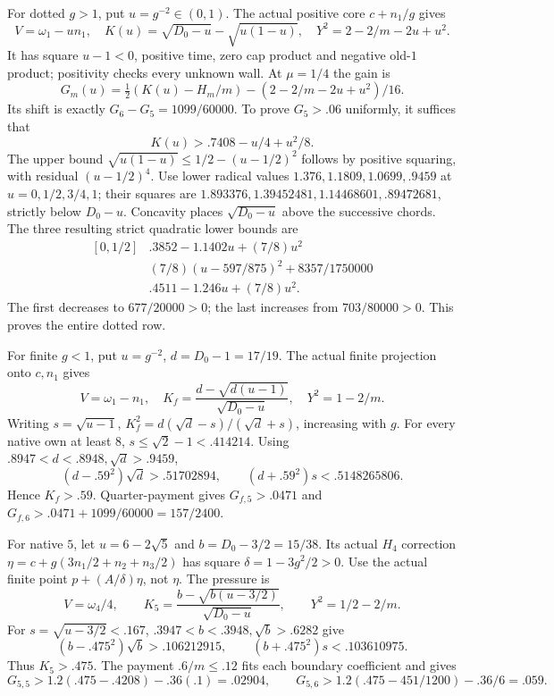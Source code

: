 For dotted \(g>1\), put \(u=g^{-2}\in(0,1)\).
The actual positive core \(c+n_1/g\) gives
\[
 V=\omega_1-un_1,\quad
 K(u)=\sqrt{D_0-u}-\sqrt{u(1-u)},\quad
 Y^2=2-2/m-2u+u^2.
\]
It has square \(u-1<0\), positive time,
zero cap product and negative old-\(1\)
product; positivity checks every unknown wall.
At \(\mu=1/4\) the gain is
\[
 G_m(u)=\tfrac12(K(u)-H_m/m)
        -(2-2/m-2u+u^2)/16.
\]
Its shift is exactly
\(G_6-G_5=1099/60000\).
To prove \(G_5>.06\) uniformly, it suffices that
\[
 K(u)>.7408-u/4+u^2/8.
\]
The upper bound
\(\sqrt{u(1-u)}\leq1/2-(u-1/2)^2\)
follows by positive squaring, with residual
\((u-1/2)^4\).
Use lower radical values \(1.376,1.1809,1.0699,.9459\)
at \(u=0,1/2,3/4,1\); their squares are
\(1.893376,1.39452481,1.14468601,.89472681\),
strictly below \(D_0-u\).
Concavity places \(\sqrt{D_0-u}\) above the
successive chords. The three resulting
strict quadratic lower bounds are
\[
\begin{array}{c|l}
[0,1/2]&.3852-1.1402u+(7/8)u^2\\
[1/2,3/4]&
(7/8)(u-597/875)^2+8357/1750000\\
[3/4,1]&.4511-1.246u+(7/8)u^2.
\end{array}
\]
The first decreases to \(677/20000>0\);
the last increases from \(703/80000>0\).
This proves the entire dotted row.

For finite \(g<1\), put \(u=g^{-2}\), \(d=D_0-1=17/19\).
The actual finite projection onto \(c,n_1\)
gives
\[
 V=\omega_1-n_1,\quad
 K_f=\frac{d-\sqrt{d(u-1)}}{\sqrt{D_0-u}},\quad
 Y^2=1-2/m.
\]
Writing \(s=\sqrt{u-1}\),
\(K_f^2=d(\sqrt d-s)/(\sqrt d+s)\), increasing
with \(g\).
For every native own at least \(8\),
\(s\leq\sqrt2-1<.414214\).
Using \(.8947<d<.8948,\sqrt d>.9459\),
\[
 (d-.59^2)\sqrt d>.51702894,\qquad
 (d+.59^2)s<.5148265806.
\]
Hence \(K_f>.59\). Quarter-payment gives
\(G_{f,5}>.0471\) and
\(G_{f,6}>.0471+1099/60000=157/2400\).

For native \(5\), let \(u=6-2\sqrt5\) and
\(b=D_0-3/2=15/38\).
Its actual \(H_4\) correction
\(\eta=c+g(3n_1/2+n_2+n_3/2)\)
has square \(\delta=1-3g^2/2>0\).
Use the actual finite point
\(p+(A/\delta)\eta\), not \(\eta\).
The pressure is
\[
 V=\omega_4/4,\qquad
 K_5=\frac{b-\sqrt{b(u-3/2)}}{\sqrt{D_0-u}},
 \qquad Y^2=1/2-2/m.
\]
For \(s=\sqrt{u-3/2}<.167\),
\(.3947<b<.3948,\sqrt b>.6282\) give
\[
 (b-.475^2)\sqrt b>.106212915,\qquad
 (b+.475^2)s<.103610975.
\]
Thus \(K_5>.475\).
The payment \(.6/m\leq.12\) fits each
boundary coefficient and gives
\[
 G_{5,5}>1.2(.475-.4208)-.36(.1)=.02904,\qquad
 G_{5,6}>1.2(.475-451/1200)-.36/6=.059.
\]

